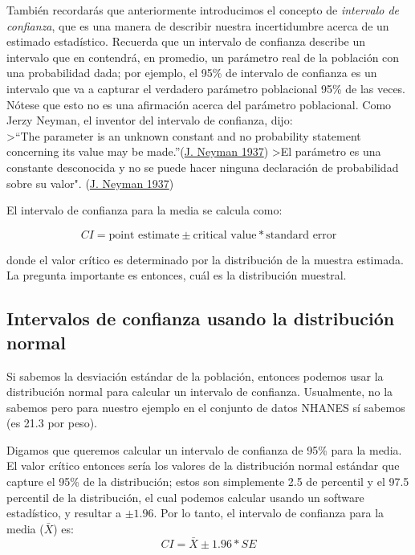 \documentclass[
  12pt,
]{book}
\theoremstyle{definition}
\theoremstyle{definition}
\theoremstyle{definition}
\theoremstyle{remark}
\begin{document}
También recordarás que anteriormente introducimos el concepto de \emph{intervalo de confianza}, que es una manera de describir nuestra incertidumbre acerca de un estimado estadístico. Recuerda que un intervalo de confianza describe un intervalo que en contendrá, en promedio, un parámetro real de la población con una probabilidad dada; por ejemplo, el 95\% de intervalo de confianza es un intervalo que va a capturar el verdadero parámetro poblacional 95\% de las veces. Nótese que esto no es una afirmación acerca del parámetro poblacional. Como Jerzy Neyman, el inventor del intervalo de confianza, dijo:\\
\textgreater{}``The parameter is an unknown constant and no probability statement concerning its value may be made.''(\protect\hyperlink{ref-Neyman37}{J. Neyman 1937})
\textgreater El parámetro es una constante desconocida y no se puede hacer ninguna declaración de probabilidad sobre su valor". (\protect\hyperlink{ref-Neyman37}{J. Neyman 1937})

El intervalo de confianza para la media se calcula como:

\[
CI = \text{point estimate} \pm \text{critical value} * \text{standard error}
\]

donde el valor crítico es determinado por la distribución de la muestra estimada. La pregunta importante es entonces, cuál es la distribución muestral.

\hypertarget{intervalos-de-confianza-usando-la-distribuciuxf3n-normal}{%
\subsection{Intervalos de confianza usando la distribución normal}\label{intervalos-de-confianza-usando-la-distribuciuxf3n-normal}}

Si sabemos la desviación estándar de la población, entonces podemos usar la distribución normal para calcular un intervalo de confianza. Usualmente, no la sabemos pero para nuestro ejemplo en el conjunto de datos NHANES sí sabemos (es 21.3 por peso).

Digamos que queremos calcular un intervalo de confianza de 95\% para la media. El valor crítico entonces sería los valores de la distribución normal estándar que capture el 95\% de la distribución; estos son simplemente 2.5 de percentil y el 97.5 percentil de la distribución, el cual podemos calcular usando un software estadístico, y resultar a \(\pm 1.96\). Por lo tanto, el intervalo de confianza para la media (\(\bar{X}\)) es:
\[
CI = \bar{X} \pm 1.96*SE
\]
\end{document}
